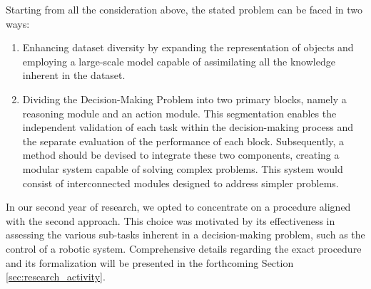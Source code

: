 Starting from all the consideration above, the stated problem can be faced in two ways:
\begin{enumerate}
    \item Enhancing dataset diversity by expanding the representation of objects and employing a large-scale model capable of assimilating all the knowledge inherent in the dataset.
    \item Dividing the Decision-Making Problem into two primary blocks, namely a reasoning module and an action module. This segmentation enables the independent validation of each task within the decision-making process and the separate evaluation of the performance of each block. Subsequently, a method should be devised to integrate these two components, creating a modular system capable of solving complex problems. This system would consist of interconnected modules designed to address simpler problems.
\end{enumerate}
In our second year of research, we opted to concentrate on a procedure aligned with the second approach. This choice was motivated by its effectiveness in assessing the various sub-tasks inherent in a decision-making problem, such as the control of a robotic system. Comprehensive details regarding the exact procedure and its formalization will be presented in the forthcoming Section \ref{sec:research_activity}.
